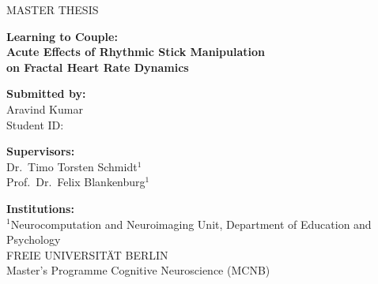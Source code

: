 \begin{titlepage}
\centering
\vspace*{1.5cm}
{\large MASTER THESIS\par}
\vspace{1.5cm}
{\LARGE\bfseries Learning to Couple:\\[0.3em]
Acute Effects of Rhythmic Stick Manipulation\\
on Fractal Heart Rate Dynamics\par}
\vspace{2.5cm}

\begin{minipage}[t]{0.45\textwidth}
\raggedright
\textbf{Submitted by:}\\
Aravind Kumar\\
Student ID: 
\end{minipage}%
\hfill
\begin{minipage}[t]{0.45\textwidth}
\raggedleft
\textbf{Supervisors:} \\
Dr.\ Timo Torsten Schmidt$^{1}$\\
Prof.\ Dr.\ Felix Blankenburg$^{1}$
\end{minipage}

\vspace{2.5cm}
\textbf{Institutions:}\\[0.5em]
$^{1}$Neurocomputation and Neuroimaging Unit, Department of Education and Psychology\\
FREIE UNIVERSITÄT BERLIN\\[0.3em]
Master's Programme Cognitive Neuroscience (MCNB)

\vfill
{\large {}\par}
\end{titlepage}
